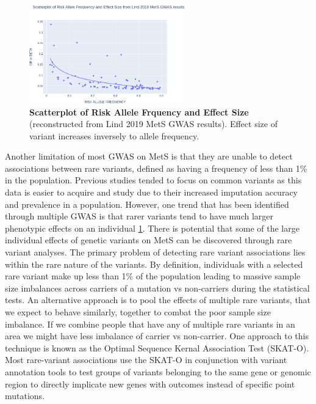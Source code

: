 \documentclass[11pt]{article}
\begin{document}
\begin{figure}
  \begin{center}
    \includegraphics[width=0.60\textwidth]{"images/fig1v2.png"}
  \end{center}
  \caption{\textbf{Scatterplot of Risk Allele Frquency and Effect Size} (reconstructed from Lind 2019 MetS GWAS results). Effect size of variant increases inversely to allele frequency.}
  \label{fig:f1}
\end{figure}

Another limitation of most GWAS on MetS is that they are unable to detect associations between rare variants, defined as having a frequency of less than 1\% in the population. Previous studies tended to focus on common variants as this data is easier to acquire and study due to their increased imputation accuracy and prevalence in a population. However, one trend that has been identified through multiple GWAS is that rarer variants tend to have much larger phenotypic effects on an individual \ref{fig:f1}. There is potential that some of the large individual effects of genetic variants on MetS can be discovered through rare variant analyses. The primary problem of detecting rare variant associations lies within the rare nature of the variants. By definition, individuals with a selected rare variant make up less than 1\% of the population leading to massive sample size imbalances across carriers of a mutation vs non-carriers during the statistical tests. An alternative approach is to pool the effects of multiple rare variants, that we expect to behave similarly, together to combat the poor sample size imbalance. If we combine people that have any of multiple rare variants in an area we might have less imbalance of carrier vs non-carrier. One approach to this technique is known as the Optimal Sequence Kernal Association Test (SKAT-O). Most rare-variant associations use the SKAT-O in conjunction with variant annotation tools to test groups of variants belonging to the same gene or genomic region to directly implicate new genes with outcomes instead of specific point mutations. 
\end{document}
